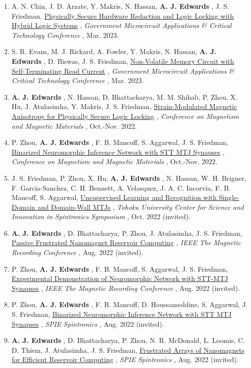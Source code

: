 \documentclass[12pt]{article}
\begin{document}
\begin{enumerate}
\item A. N. Chin, J. D. Arzate, Y. Makris, N. Hassan, \textbf{A. J. Edwards} , J. S. Friedman, \ul{Physically Secure Hardware Redaction and Logic Locking with Hybrid Logic Systems} , \textit{Government Microcircuit Applications \& Critical Technology Conference} , Mar. 2023.
\item S. R. Evans, M. J. Rickard, A. Fowler, Y. Makris, N. Hassan, \textbf{A. J. Edwards} , D. Biswas, J. S. Friedman, \ul{Non-Volatile Memory Circuit with Self-Terminating Read Current} , \textit{Government Microcircuit Applications \& Critical Technology Conference} , Mar. 2023.
\item \textbf{A. J. Edwards} , N. Hassan, D. Bhattacharya, M. M. Shihab, P. Zhou, X. Hu, J. Atulasimha, Y. Makris, J. S. Friedman, \ul{Strain-Modulated Magnetic Anisotropy for Physically Secure Logic Locking} , \textit{Conference on Magnetism and Magnetic Materials} , Oct.-Nov. 2022.
\item P. Zhou, \textbf{A. J. Edwards} , F. B. Mancoff, S. Aggarwal, J. S. Friedman, \ul{Binarized Neuromorphic Inference Network with STT MTJ Synapses} , \textit{Conference on Magnetism and Magnetic Materials} , Oct.-Nov. 2022.
\item J. S. Friedman, P. Zhou, X. Hu, \textbf{A. J. Edwards} , N. Hassan, W. H. Brigner, F. Garcia-Sanchez, C. H. Bennett, A. Velasquez, J. A. C. Incorvia, F. B. Mancoff, S. Aggarwal, \ul{Unsupervised Learning and Recognition with Single-Domain and Domain-Wall MTJs} , \textit{Tohoku University Center for Science and Innovation in Spintronics Symposium} , Oct. 2022 (invited).
\item \textbf{A. J. Edwards} , D. Bhattacharya, P. Zhou, J. Atulasimha, J. S. Friedman, \ul{Passive Frustrated Nanomagnet Reservoir Computing} , \textit{IEEE The Magnetic Recording Conference} , Aug. 2022 (invited).
\item P. Zhou, \textbf{A. J. Edwards} , F. B. Mancoff, S. Aggarwal, J. S. Friedman, \ul{Experimental Demonstration of Neuromorphic Network with STT-MTJ Synapses} , \textit{IEEE The Magnetic Recording Conference} , Aug. 2022 (invited).
\item P. Zhou, \textbf{A. J. Edwards} , F. B. Mancoff, D. Houssameddine, S. Aggarwal, J. S. Friedman, \ul{Binarized Neuromorphic Inference Network with STT MTJ Synapses} , \textit{SPIE Spintronics} , Aug. 2022 (invited).
\item \textbf{A. J. Edwards} , D. Bhattacharya, P. Zhou, N. R. McDonald, L. Loomis, C. D. Thiem, J. Atulasimha, J. S. Friedman, \ul{Frustrated Arrays of Nanomagnets for Efficient Reservoir Computing} , \textit{SPIE Spintronics} , Aug. 2022 (invited).

\end{enumerate}
\end{document}
